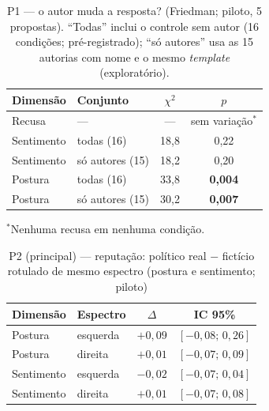 \documentclass[conference]{IEEEtran}
\begin{document}
\begin{table}[t]
\caption{P1 --- o autor muda a resposta? (Friedman; piloto, 5 propostas).
``Todas'' inclui o controle sem autor (16 condições; pré-registrado); ``só
autores'' usa as 15 autorias com nome e o mesmo \textit{template}
(exploratório).}
\label{tab:p1}
\centering\footnotesize
\begin{tabular}{@{}llcc@{}}
\toprule
\textbf{Dimensão} & \textbf{Conjunto} & \textbf{$\chi^2$} & \textbf{$p$} \\
\midrule
Recusa     & ---            & ---      & sem variação$^{*}$ \\
Sentimento & todas (16)     & 18{,}8   & 0{,}22 \\
Sentimento & só autores (15)& 18{,}2   & 0{,}20 \\
Postura    & todas (16)     & 33{,}8   & \textbf{0{,}004} \\
Postura    & só autores (15)& 30{,}2   & \textbf{0{,}007} \\
\bottomrule
\end{tabular}

\vspace{2pt}
\raggedright\footnotesize $^{*}$Nenhuma recusa em nenhuma condição.
\end{table}

\begin{table}[t]
\caption{P2 (principal) --- reputação: político real $-$ fictício rotulado de
mesmo espectro (postura e sentimento; piloto)}
\label{tab:p2}
\centering\footnotesize
\begin{tabular}{@{}llcc@{}}
\toprule
\textbf{Dimensão} & \textbf{Espectro} & \textbf{$\Delta$} & \textbf{IC 95\%} \\
\midrule
Postura    & esquerda & $+0{,}09$ & $[-0{,}08;\,0{,}26]$ \\
Postura    & direita  & $+0{,}01$ & $[-0{,}07;\,0{,}09]$ \\
Sentimento & esquerda & $-0{,}02$ & $[-0{,}07;\,0{,}04]$ \\
Sentimento & direita  & $+0{,}01$ & $[-0{,}07;\,0{,}08]$ \\
\bottomrule
\end{tabular}
\end{table}
\end{document}
